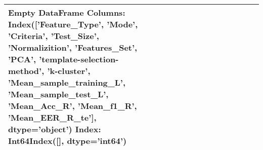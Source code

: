 \begin{tabular}{llllrllrlrrrrrr}
\toprule
Empty DataFrame
Columns: Index(['Feature\_Type', 'Mode', 'Criteria', 'Test\_Size', 'Normalizition',
       'Features\_Set', 'PCA', 'template-selection-method', 'k-cluster',
       'Mean\_sample\_training\_L', 'Mean\_sample\_test\_L', 'Mean\_Acc\_R',
       'Mean\_f1\_R', 'Mean\_EER\_R\_te'],
      dtype='object')
Index: Int64Index([], dtype='int64') \\
\bottomrule
\end{tabular}
